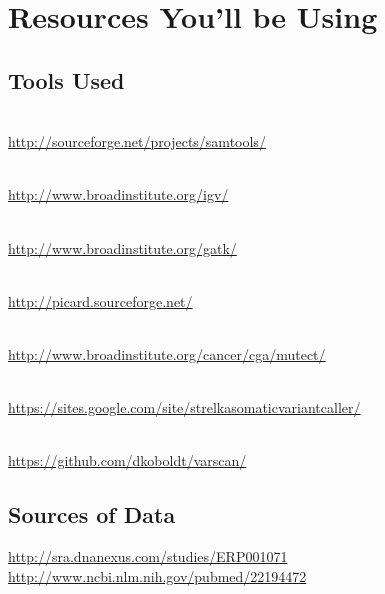 
\section{Resources You'll be Using}

\subsection{Tools Used}

\begin{description}[style=multiline,labelindent=0cm,align=left,leftmargin=1cm]
  \item[SAMTools] \hfill\\
    \url{http://sourceforge.net/projects/samtools/}
  \item[IGV] \hfill\\
    \url{http://www.broadinstitute.org/igv/}
  \item[Genome Analysis Toolkit] \hfill\\
    \url{http://www.broadinstitute.org/gatk/}
  \item[Picard] \hfill\\
    \url{http://picard.sourceforge.net/}
  \item[MuTect] \hfill\\
    \url{http://www.broadinstitute.org/cancer/cga/mutect/}
  \item[Strelka] \hfill\\
    \url{https://sites.google.com/site/strelkasomaticvariantcaller/}
  \item[VarScan2] \hfill\\
    \url{https://github.com/dkoboldt/varscan/}

\end{description}


\subsection{Sources of Data}

\url{http://sra.dnanexus.com/studies/ERP001071}\\
\url{http://www.ncbi.nlm.nih.gov/pubmed/22194472}


